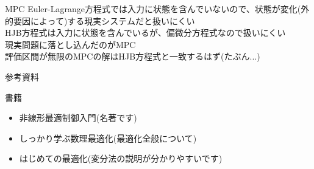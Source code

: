 \documentclass[dvipdfmx,12pt]{beamer}
\begin{document}
    \begin{frame}{MPC}
        Euler-Lagrange方程式では入力に状態を含んでいないので、状態が変化(外的要因によって)する現実システムだと扱いにくい \\
        HJB方程式は入力に状態を含んでいるが、偏微分方程式なので扱いにくい \\
        現実問題に落とし込んだのがMPC \\
        評価区間が無限のMPCの解はHJB方程式と一致するはず(たぶん...) \\
    \end{frame}

    \begin{frame}{参考資料}
        \footnotesize

        書籍\\
        \begin{itemize}
            \item 非線形最適制御入門(名著です)
            \item しっかり学ぶ数理最適化(最適化全般について)
            \item はじめての最適化(変分法の説明が分かりやすいです)
        \end{itemize}
    \end{frame}
    
\end{document}
